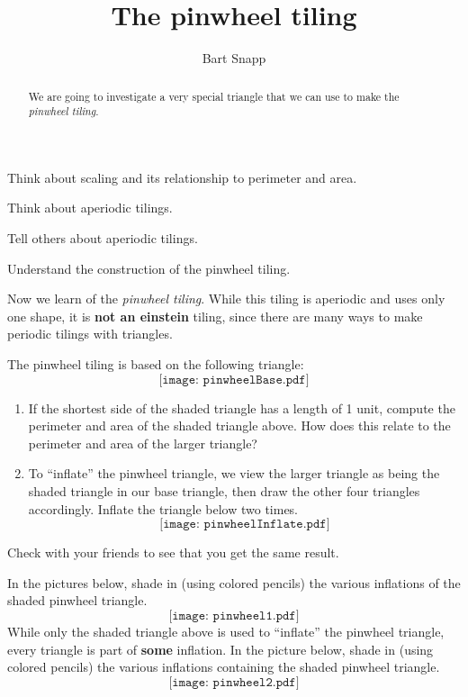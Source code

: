 \documentclass[noauthor,nooutcomes,handout,hints,12pt]{ximera}
\title{The pinwheel tiling}
\author{Bart Snapp}
\begin{document}
\begin{abstract}
   We are going to investigate a very special triangle that we can use
   to make the \textit{pinwheel tiling}.
\end{abstract}
\maketitle

\begin{listOutcomes}
\item Think about scaling and its relationship to perimeter and area.
\item Think about aperiodic tilings.
\item Tell others about aperiodic tilings.
\item Understand the construction of the pinwheel tiling.
\end{listOutcomes}

Now we learn of the \textit{pinwheel tiling}. While this tiling is
aperiodic and uses only one shape, it is \textbf{not an einstein}
tiling, since there are many ways to make periodic tilings with
triangles.


\mynewpage

\begin{question}
The pinwheel tiling is based on the following triangle:
\[
\texttt{[image: pinwheelBase.pdf]}
\]

\begin{enumerate}
\item If the shortest side of the shaded triangle has a length of 1
  unit, compute the perimeter and area of the shaded triangle
  above. How does this relate to the perimeter and area of the larger
  triangle?

\vfill
  
\item To ``inflate'' the pinwheel triangle, we view the larger
  triangle as being the shaded triangle in our base triangle, then
  draw the other four triangles accordingly. Inflate the triangle
  below two times.
  \[
  \texttt{[image: pinwheelInflate.pdf]}
  \]
\end{enumerate}
Check with your friends to see that you get the same result.
\end{question}

\mynewpage

\begin{question}
In the pictures below, shade in (using colored pencils) the various
inflations of the shaded pinwheel triangle.
\[
\texttt{[image: pinwheel1.pdf]}
\]
While only the shaded triangle above is used to ``inflate'' the
pinwheel triangle, every triangle is part of \textbf{some}
inflation. In the picture below, shade in (using colored pencils) the
various inflations containing the shaded pinwheel triangle.
\[
\texttt{[image: pinwheel2.pdf]}
\]
\end{question}
\end{document}
